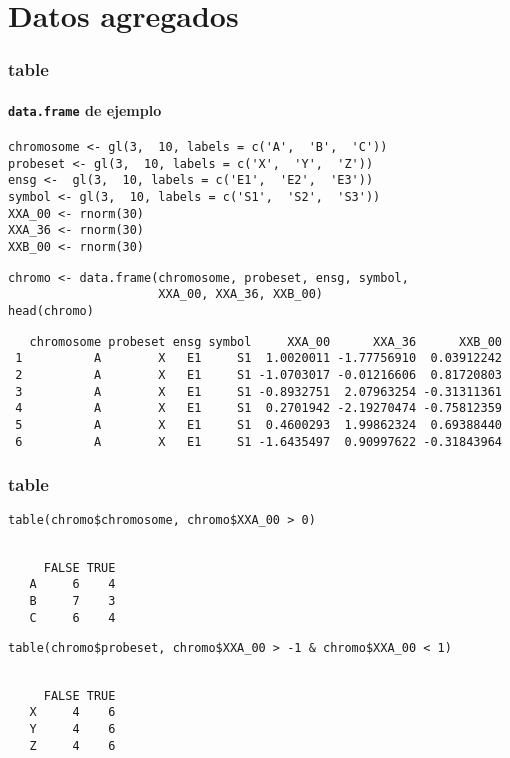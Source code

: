 \documentclass[xcolor={usenames,svgnames,dvipsnames}]{beamer}
\begin{document}
\section{Datos agregados}
\label{sec-3}
\begin{frame}[fragile]
\frametitle{table}
\framesubtitle{\texttt{data.frame} de ejemplo}
\label{sec-3-1}


\lstset{language=R}
\begin{lstlisting}
chromosome <- gl(3,  10, labels = c('A',  'B',  'C'))
probeset <- gl(3,  10, labels = c('X',  'Y',  'Z'))
ensg <-  gl(3,  10, labels = c('E1',  'E2',  'E3'))
symbol <- gl(3,  10, labels = c('S1',  'S2',  'S3'))
XXA_00 <- rnorm(30)
XXA_36 <- rnorm(30)
XXB_00 <- rnorm(30)
\end{lstlisting}



\lstset{language=R}
\begin{lstlisting}
chromo <- data.frame(chromosome, probeset, ensg, symbol,
                     XXA_00, XXA_36, XXB_00)
head(chromo)
\end{lstlisting}

\begin{verbatim}
   chromosome probeset ensg symbol     XXA_00      XXA_36      XXB_00
 1          A        X   E1     S1  1.0020011 -1.77756910  0.03912242
 2          A        X   E1     S1 -1.0703017 -0.01216606  0.81720803
 3          A        X   E1     S1 -0.8932751  2.07963254 -0.31311361
 4          A        X   E1     S1  0.2701942 -2.19270474 -0.75812359
 5          A        X   E1     S1  0.4600293  1.99862324  0.69388440
 6          A        X   E1     S1 -1.6435497  0.90997622 -0.31843964
\end{verbatim}
\end{frame}
\begin{frame}[fragile]
\frametitle{table}
\label{sec-3-2}


\lstset{language=R}
\begin{lstlisting}
table(chromo$chromosome, chromo$XXA_00 > 0)
\end{lstlisting}

\begin{verbatim}
    
     FALSE TRUE
   A     6    4
   B     7    3
   C     6    4
\end{verbatim}


\lstset{language=R}
\begin{lstlisting}
table(chromo$probeset, chromo$XXA_00 > -1 & chromo$XXA_00 < 1)
\end{lstlisting}

\begin{verbatim}
    
     FALSE TRUE
   X     4    6
   Y     4    6
   Z     4    6
\end{verbatim}
\end{frame}
\end{document}

